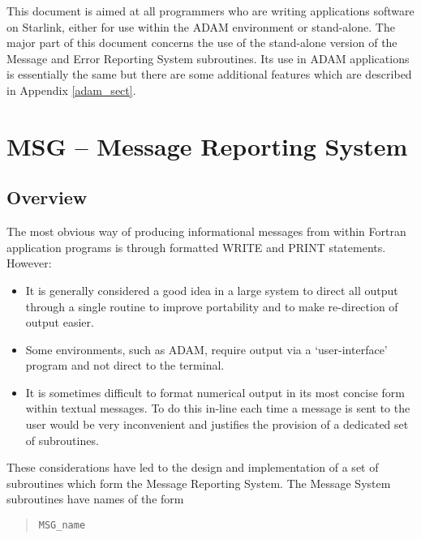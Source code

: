 \documentclass[twoside,11pt]{article}
\newcommand{\htmlref}[2]{#1}
\newcommand{\latex}[1]{#1}
\newcommand{\xref}[3]{#1}
\newcommand{\xlabel}[1]{}
\renewcommand{\_}{\texttt{\symbol{95}}}
\begin{document}
This document is aimed at all programmers who are writing applications software
on Starlink, either for use within the 
\xref{ADAM environment}{sg4}{}
or stand-alone.
The major part of this document concerns the use of the stand-alone version of
the Message and Error Reporting System subroutines.
Its use in ADAM applications is essentially the same but there are some
\htmlref
{additional features}{adam_sect}\latex{ which are described in Appendix \ref{adam_sect}}.

\section{\xlabel{msg_message_reporting_system}MSG -- Message Reporting System \xlabel{msg}}

\subsection{\xlabel{overview}Overview}

The most obvious way of producing informational messages from within 
Fortran application programs is through formatted WRITE and PRINT 
statements.
However:
\begin{itemize}
\item It is generally considered a good idea in a large system to direct
all output through a single routine to improve portability and to make
re-direction of output easier.
\item Some environments, such as ADAM, require output via a `user-interface'
program and not direct to the terminal.
\item It is sometimes difficult to format numerical output in its most
concise form within textual messages.
To do this in-line each time a message is sent to the user would be very
inconvenient and justifies the provision of a dedicated set of subroutines. 
\end{itemize} 
These considerations have led to the design and implementation of a set of
subroutines which form the Message Reporting System.
The Message System subroutines have names of the form

\begin {quote}
\begin {small}
\begin{verbatim}
MSG_name
\end{verbatim}
\end {small}
\end {quote}
\end{document}
